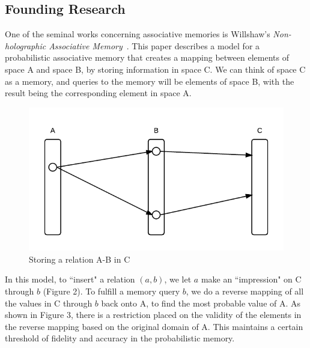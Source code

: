 \documentclass{sig-alternate}
\begin{document}
\subsection{Founding Research}
\label{subsec:founding}

One of the seminal works concerning associative memories is Willshaw's \textit{Non-holographic
Associative Memory}~\cite{holographic}. This paper describes a model for a probabilistic associative memory
that creates a mapping between elements of space A and space B, by storing information
in space C. We can think of space C as a memory, and queries to the memory will be elements
of space B, with the result being the corresponding element in space A.

\begin{figure}[H]
	\begin{center}
		\includegraphics[width=1\linewidth]{mapping}
	\end{center}
	\vspace{-12pt}
	\caption{Storing a relation A-B in C}
	\label{fig:mapping}
\end{figure}

In this model, to ``insert" a relation $(a, b)$, we let $a$ make an ``impression" on C through $b$ (Figure 2).
To fulfill a memory query $b$, we do a reverse mapping of all the values in C through $b$
back onto A, to find the most probable value of A. As shown in Figure 3, there is a restriction placed on the validity of the
elements in the reverse mapping based on the original domain of A. This maintains a certain threshold of fidelity and accuracy in
the probabilistic memory.
\end{document}
